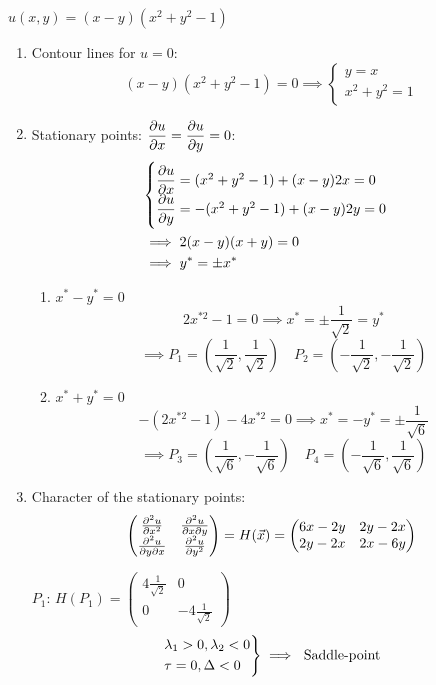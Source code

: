 \documentclass[twoside]{scrartcl}
\begin{document}
\begin{example}
$u(x,y) = (x-y)(x^2 + y^2 -1)$
\begin{enumerate}
\item Contour lines for $u= 0$:
\[(x-y)(x^2 + y^2 - 1) = 0 \implies\begin{cases}
y = x \\ x^2 + y^2 = 1	
\end{cases}
\]
\item Stationary points: $\dfrac{\partial u}{\partial x} = \dfrac{\partial u}{\partial y} = 0$:
\[
\begin{aligned}
&\begin{cases}
\dfrac{\partial u}{\partial x} = (x^2 + y^2 - 1) + (x-y)2x = 0\\
\dfrac{\partial u}{\partial y} = -(x^2 + y^2 -1) + (x-y)2y = 0	
\end{cases}\\
&\implies 2(x-y)(x+y) = 0\\
&\implies y^* = \pm x^*
\end{aligned}
\]
\begin{enumerate}
\item $x^* - y^* = 0$
\[2x^{*2} -1 = 0 \implies x^* = \pm \frac{1}{\sqrt{2}} = y^*\]
\[\implies P_1 = \left(\frac{1}{\sqrt{2}},\frac{1}{\sqrt{2}}\right) 
\quad P_2 = \left(-\frac{1}{\sqrt{2}},-\frac{1}{\sqrt{2}}\right)\]

\item $x^* + y^* = 0$
\[-(2x^{*2}-1) -4x^{*2} = 0\implies x^* = -y^* = \pm \frac{1}{\sqrt{6}}\]
\[\implies P_3 = \left(\frac{1}{\sqrt{6}},-\frac{1}{\sqrt{6}}\right) 
\quad P_4 = \left(-\frac{1}{\sqrt{6}},\frac{1}{\sqrt{6}}\right)\]
\end{enumerate}
\item Character of the stationary points:
\[\begin{pmatrix}
\frac{\partial^2u}{\partial x^2} & \frac{\partial^2u}{\partial x\partial y}\\
\frac{\partial^2u}{\partial y \partial x} & \frac{\partial^2u}{\partial y^2}	
\end{pmatrix}
= H(\vec{x}) = 
\begin{pmatrix}
6x - 2y & 2y - 2x\\
2y - 2x & 2x - 6y	
\end{pmatrix}
\]

$P_1$: 
$H(P_1) = \begin{pmatrix}
 4\frac{1}{\sqrt{2}}& 0 \\ 0 & -4\frac{1}{\sqrt{2}}	
 \end{pmatrix}
$
\[\begin{rcases*}
\lambda_1 > 0, \lambda_2 < 0 \\
\tau = 0, \Delta < 0	
\end{rcases*}\implies \text{ Saddle-point}
\]


\end{enumerate}
\end{example}
\end{document}
